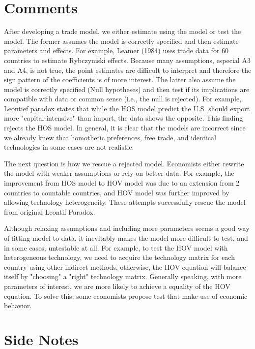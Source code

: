 \documentclass{article}
\begin{document}
\section{Comments}
After developing a trade model, we either estimate using the model or test the model. The former assumes the model is correctly specified and then estimate parameters and effects. For example, Leamer (1984) uses trade data for 60 countries to estimate Rybczyniski effects. Because many assumptions, especial A3 and A4, is not true, the point estimates are difficult to interpret and therefore the sign pattern of the coefficients is of more interest. The latter also assume the model is correctly specified (Null hypotheses) and then test if its implications are compatible with data or common sense (i.e., the null is rejected). For example, Leontief paradox states that while the HOS model predict the U.S. should export more "capital-intensive" than import, the data shows the opposite. This finding rejects the HOS model. In general, it is clear that the models are incorrect since we already knew that homothetic preferences, free trade, and identical technologies in some cases are not realistic.

The next question is how we rescue a rejected model. Economists either rewrite the model with weaker assumptions or rely on better data. For example, the improvement from HOS model to HOV model was due to an extension from 2 countries to countable countries, and HOV model was further improved by allowing technology heterogeneity. These attempts successfully rescue the model from original Leontif Paradox. 

Although relaxing assumptions and including more parameters seems a good way of fitting model to data, it inevitably  makes the model more difficult to test, and in some cases, untestable at all. For example, to test the HOV model with heterogeneous technology, we need to acquire the technology matrix for each country using other indirect methods, otherwise, the HOV equation will balance itself by "choosing" a "right" technology matrix. Generally speaking, with more parameters of interest, we are more likely to achieve a equality of the HOV equation. To solve this, some economists propose test that make use of economic behavior. 

\section{Side Notes}
\end{document}
